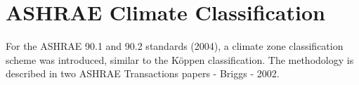 \section{ASHRAE Climate Classification}\label{ashrae-climate-classification}

For the ASHRAE 90.1 and 90.2 standards (2004), a climate zone classification scheme was introduced, similar to the Köppen classification. The methodology is described in two ASHRAE Transactions papers - Briggs - 2002.
